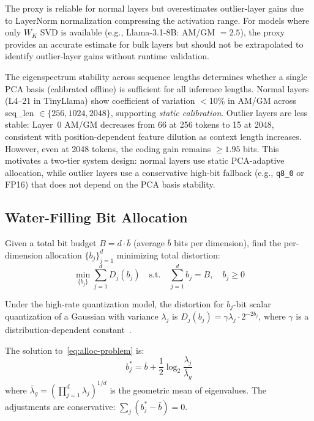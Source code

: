 \noindent The proxy is reliable for normal layers but overestimates outlier-layer gains due to LayerNorm normalization compressing the activation range. For models where only $W_K$ SVD is available (e.g., Llama-3.1-8B: AM/GM $= 2.5$), the proxy provides an accurate estimate for bulk layers but should not be extrapolated to identify outlier-layer gains without runtime validation.

\begin{remark}
\label{rem:seqlen}
The eigenspectrum stability across sequence lengths determines whether a single PCA basis (calibrated offline) is sufficient for all inference lengths. Normal layers (L4--21 in TinyLlama) show coefficient of variation $<$10\% in AM/GM across seq\_len $\in \{256, 1024, 2048\}$, supporting \emph{static calibration}. Outlier layers are less stable: Layer~0 AM/GM decreases from 66 at 256 tokens to 15 at 2048, consistent with position-dependent feature dilution as context length increases. However, even at 2048 tokens, the coding gain remains $\geq 1.95$ bits. This motivates a two-tier system design: normal layers use static PCA-adaptive allocation, while outlier layers use a conservative high-bit fallback (e.g., \texttt{q8\_0} or FP16) that does not depend on the PCA basis stability.
\end{remark}

\subsection{Water-Filling Bit Allocation}
\label{sec:water-filling}

\begin{definition}
Given a total bit budget $B = d \cdot \bar{b}$ (average $\bar{b}$ bits per dimension), find the per-dimension allocation $\{b_j\}_{j=1}^d$ minimizing total distortion:
\begin{equation}
    \min_{\{b_j\}} \sum_{j=1}^d D_j(b_j) \quad \text{s.t.} \quad \sum_{j=1}^d b_j = B, \quad b_j \geq 0
    \label{eq:alloc-problem}
\end{equation}
\end{definition}

Under the high-rate quantization model, the distortion for $b_j$-bit scalar quantization of a Gaussian with variance $\lambda_j$ is $D_j(b_j) = \gamma \lambda_j \cdot 2^{-2b_j}$, where $\gamma$ is a distribution-dependent constant~\citep{gersho1992}.

\begin{theorem}
\label{thm:water-filling}
The solution to~\eqref{eq:alloc-problem} is:
\begin{equation}
    b_j^* = \bar{b} + \frac{1}{2} \log_2 \frac{\lambda_j}{\bar{\lambda}_g}
    \label{eq:optimal-alloc}
\end{equation}
where $\bar{\lambda}_g = \left(\prod_{j=1}^d \lambda_j\right)^{1/d}$ is the geometric mean of eigenvalues. The adjustments are conservative: $\sum_j (b_j^* - \bar{b}) = 0$.
\end{theorem}

